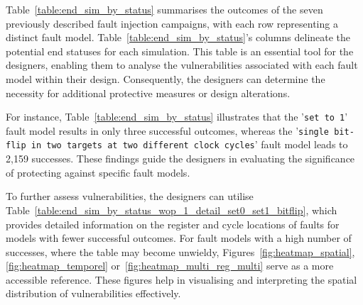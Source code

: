 Table~\ref{table:end_sim_by_status} summarises the outcomes of the seven previously described fault injection campaigns, with each row representing a distinct fault model. Table~\ref{table:end_sim_by_status}'s columns delineate the potential end statuses for each simulation. This table is an essential tool for the designers, enabling them to analyse the vulnerabilities associated with each fault model within their design. Consequently, the designers can determine the necessity for additional protective measures or design alterations.

For instance, Table~\ref{table:end_sim_by_status} illustrates that the '\texttt{set to 1}' fault model results in only three successful outcomes, whereas the '\texttt{single bit-flip in two targets at two different clock cycles}' fault model leads to 2,159 successes. These findings guide the designers in evaluating the significance of protecting against specific fault models.

To further assess vulnerabilities, the designers can utilise Table~\ref{table:end_sim_by_status_wop_1_detail_set0_set1_bitflip}, which provides detailed information on the register and cycle locations of faults for models with fewer successful outcomes. For fault models with a high number of successes, where the table may become unwieldy, Figures~\ref{fig:heatmap_spatial}, \ref{fig:heatmap_temporel} or~\ref{fig:heatmap_multi_reg_multi} serve as a more accessible reference. These figures help in visualising and interpreting the spatial distribution of vulnerabilities effectively.

